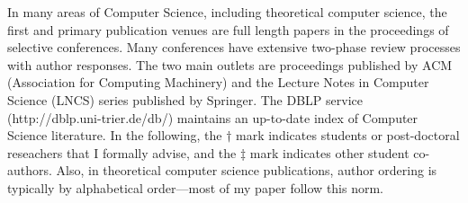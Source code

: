 \documentclass{article}
\begin{document}

\vspace{1em}
In many areas of Computer Science, including theoretical computer science, the first and primary publication venues are full length papers
in the proceedings of selective conferences. 
Many conferences have extensive two-phase review processes with author
responses. The two main outlets are proceedings published 
by ACM (Association for Computing Machinery) and the Lecture Notes in Computer
Science (LNCS) series published by Springer. The DBLP service
(http://dblp.uni-trier.de/db/) maintains an up-to-date index of Computer Science
literature. In the following, the  $\dag$ mark indicates students or post-doctoral
reseachers that I formally advise, and the $\ddag$ mark indicates other student
co-authors.
Also, in theoretical computer science publications, author ordering is typically
by alphabetical order---most of my paper follow this norm.
\end{document}
